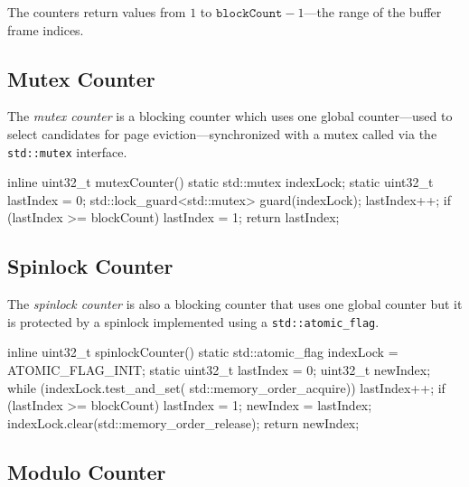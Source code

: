     The counters return values from $1$ to $\texttt{blockCount} - 1$---the range of the buffer frame indices.

\subsection[Mutex Counter]{Mutex Counter} \label{subsec:mutex_counter}

    The \emph{mutex counter} is a blocking counter which uses one global counter---used to select candidates for page eviction---synchronized with a mutex called via the \lstinline{std::mutex} interface.

\begin{@empty}
    \lstset{
        language = [ISO]C++
    }
\begin{centeredshadowboxlisting}
inline uint32_t mutexCounter() {
    static std::mutex indexLock;
    static uint32_t lastIndex = 0;
    std::lock_guard<std::mutex> guard(indexLock);
    lastIndex++;
    if (lastIndex >= blockCount) {
        lastIndex = 1;
    }
    return lastIndex;
}
\end{centeredshadowboxlisting}
\end{@empty}

\subsection[Spinlock Counter]{Spinlock Counter} \label{subsec:spinlock_counter}

    The \emph{spinlock counter} is also a blocking counter that uses one global counter but it is protected by a spinlock implemented using a \lstinline{std::atomic_flag}.

\begin{@empty}
    \lstset{
        language = [ISO]C++
    }
\begin{centeredshadowboxlisting}
inline uint32_t spinlockCounter() {
    static std::atomic_flag indexLock =
        ATOMIC_FLAG_INIT;
    static uint32_t lastIndex = 0;
    uint32_t newIndex;
    while (indexLock.test_and_set(
               std::memory_order_acquire)) {}
    lastIndex++;
    if (lastIndex >= blockCount) {
        lastIndex = 1;
    }
    newIndex = lastIndex;
    indexLock.clear(std::memory_order_release);
    return newIndex;
}
\end{centeredshadowboxlisting}
\end{@empty}

\subsection[Modulo Counter]{Modulo Counter} \label{subsec:modulo_counter}

